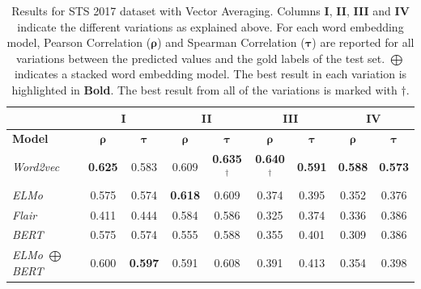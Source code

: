 \begin{enumerate}
\begin{table}[htb]
{\begin{tabular}{|l|cc|cc|cc|cc|}
			\hline & 
			\multicolumn{2}{c|}{\textbf{I}}    & \multicolumn{2}{c|}{\textbf{II}}   & \multicolumn{2}{c|}{\textbf{III}}  &    
			\multicolumn{2}{c|}{\textbf{IV}}   \\ 
			\hline
			\multicolumn{1}{|l|}{\textbf{Model}} 
			&  $\bm{\rho}$   & $\bm{\tau}$      
			&  $\bm{\rho}$   & $\bm{\tau}$  
			&  $\bm{\rho}$   & $\bm{\tau}$  
			&  $\bm{\rho}$   & $\bm{\tau}$  
			\\ \hline
			\textit{Word2vec}                     
			& \textbf{0.625} & 0.583         
			& 0.609             & \textbf{0.635}$^{\dagger}$       
			& \textbf{0.640}$^{\dagger}$    & \textbf{0.591} 
			& \textbf{0.588}    & \textbf{0.573} \\
			\textit{ELMo}                     
			& 0.575                      & 0.574         
			& \textbf{0.618}             & 0.609       
			& 0.374                      & 0.395  
			& 0.352                      & 0.376 \\
			\textit{Flair}                     
			& 0.411                      & 0.444         
			& 0.584                      & 0.586       
			& 0.325                      & 0.374  
			& 0.336                      & 0.386 \\
			\textit{BERT}                     
			& 0.575                      & 0.574         
			& 0.555                      & 0.588       
			& 0.355                      & 0.401  
			& 0.309                      & 0.386 \\
			\textit{ELMo $\bigoplus$ BERT}                     
			& 0.600                      & \textbf{0.597}       
			& 0.591                      & 0.608       
			& 0.391                      & 0.413  
			& 0.354                      & 0.398 \\
			\hline
		\end{tabular}
	}
	\caption[Results for STS 2017 with Vector Averaging]{Results for STS 2017 dataset with Vector Averaging. Columns \textbf{I}, \textbf{II}, \textbf{III} and \textbf{IV} indicate the different variations as explained above. For each word embedding model, Pearson Correlation ($\bm{\rho}$) and Spearman Correlation ($\bm{\tau}$) are reported for all variations between the predicted values and the gold labels of the test set. $\bigoplus$ indicates a stacked word embedding model. The best result in each variation is highlighted in \textbf{Bold}. The best result from all of the variations is marked with ${\dagger}$. }  
	\label{tab:sts_average_vectors}
\end{table}


\end{enumerate}
